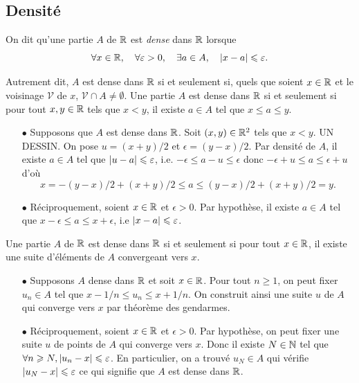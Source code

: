 \documentclass{magnolia}
\begin{document}
\subsection{Densité}


\begin{definition}[utile=-3]
On dit qu'une partie $A$  de $\mathbb{R}$ est \emph{dense} dans $\mathbb{R}$ lorsque
  \[\forall x\in\mathbb{R} ,\quad \forall \varepsilon>0 ,\quad \exists a\in A ,\quad
    \left|x-a\right|\leqslant\varepsilon.\]
  \end{definition}
  
  \begin{remarques}
  \remarque Autrement dit, $A$ est dense dans $\mathbb{R}$ si et seulement si, quels que soient
    $x\in\mathbb{R}$ et le voisinage $\mathcal{V}$ de $x$,
    $\mathcal{V}\cap A\neq\emptyset$.
  \remarque Une partie $A$ est dense dans $\mathbb{R}$ si et seulement si pour tout
    $x,y\in\mathbb{R}$ tels que $x<y$, il existe $a\in A$ tel que $x\leq a\leq y$.
  \end{remarques}
  
  \begin{sol}
  \begin{itemize}
  \item[$\bullet$] Supposons que $A$ est dense dans $\mathbb{R}$. Soit $(x,y)\in \mathbb{R}^2$ tels que $x<y$. UN DESSIN. On pose $u=(x+y)/2$ et $\epsilon=(y-x)/2$. Par densité de $A$, il existe $a\in A$ tel que $\left|u-a\right|\leqslant \varepsilon$, i.e. $-\epsilon \leq a-u\leq \epsilon$ donc $-\epsilon+u \leq a \leq \epsilon+u$ d'où $$x=-(y-x)/2+(x+y)/2 \leq a \leq (y-x)/2+(x+y)/2=y.$$
  \item[$\bullet$] Réciproquement, soient $x\in \mathbb{R}$ et $\epsilon>0$. Par hypothèse, il existe $a\in A$ tel que $x-\epsilon\leq a \leq x+\epsilon$, i.e $\left|x-a\right|\leqslant \varepsilon$.
  \end{itemize}
  
  \end{sol}
  
  \begin{proposition}[utile=-3]
  Une partie $A$ de $\mathbb{R}$ est dense dans $\mathbb{R}$ si et seulement si pour tout $x\in\mathbb{R}$, il existe
  une suite d'éléments de $A$ convergeant vers $x$.
  \end{proposition}
  
  \begin{preuve}
  \begin{itemize}
  \item[$\bullet$] Supposons $A$ dense dans $\mathbb{R}$ et soit $x\in \mathbb{R}$. Pour tout $n\geq 1$, on peut fixer $u_n \in A$ tel que $x-1/n\leq u_n\leq x+1/n$. On construit ainsi une suite $u$ de $A$ qui converge vers $x$ par théorème des gendarmes.
  \item[$\bullet$] Réciproquement, soient $x\in \mathbb{R}$ et $\epsilon>0$.
  Par hypothèse, on peut fixer une suite $u$ de points de $A$ qui converge vers $x$. Donc il existe $N\in \mathbb{N}$ tel que $\forall n\geqslant N, \left|u_n-x\right|\leqslant \varepsilon$. En particulier, on a trouvé $u_N \in A$ qui vérifie $\left|u_N-x\right|\leqslant \varepsilon$ ce qui signifie que $A$ est dense dans $\mathbb{R}$.
  \end{itemize}
  \end{preuve}
  
\end{document}
